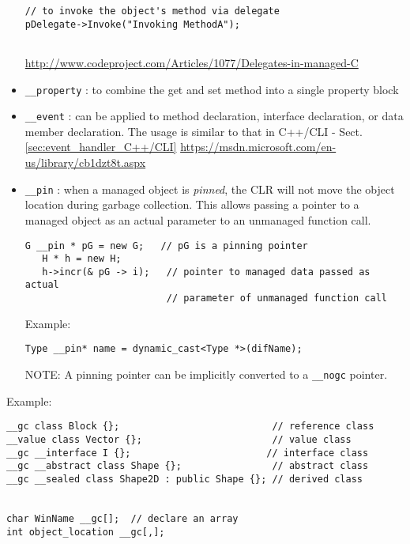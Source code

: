 \begin{itemize}
\begin{verbatim}
// to invoke the object's method via delegate
pDelegate->Invoke("Invoking MethodA");


\end{verbatim}
\url{http://www.codeproject.com/Articles/1077/Delegates-in-managed-C}


  \item \verb!__property! : to combine the get and set method into a single property block
  
  \item \verb!__event! : can be applied to method declaration, interface
  declaration, or data member declaration. The usage is similar to that in
  C++/CLI - Sect.\ref{sec:event_handler_C++/CLI}
  \url{https://msdn.microsoft.com/en-us/library/cb1dzt8t.aspx}
  
  \item \verb!__pin! : when a managed object is {\it pinned}, the CLR will not
  move the object location during garbage collection. This allows passing a
  pointer to a managed object as an actual parameter to an unmanaged function
  call.
\begin{verbatim}
G __pin * pG = new G;   // pG is a pinning pointer
   H * h = new H;
   h->incr(& pG -> i);   // pointer to managed data passed as actual
                         // parameter of unmanaged function call
\end{verbatim}  

Example:
\begin{verbatim}
Type __pin* name = dynamic_cast<Type *>(difName);
\end{verbatim}
NOTE: A pinning pointer can be implicitly converted to a \verb!__nogc! pointer.

\end{itemize}

Example:
\begin{verbatim}
__gc class Block {};                           // reference class
__value class Vector {};                       // value class
__gc __interface I {};                        // interface class
__gc __abstract class Shape {};                // abstract class
__gc __sealed class Shape2D : public Shape {}; // derived class


char WinName __gc[];  // declare an array
int object_location __gc[,];
\end{verbatim}

